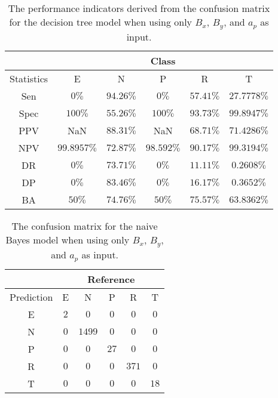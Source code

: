 \begin{table}[!ht]
	\centering
	\begin{tabular}{|c|c|c|c|c|c|}
		\hline
		 & \multicolumn{5}{c|}{Class} \\ \hline
		Statistics & E & N & P & R & T \\ \hline
		Sen & $0\%$ & $94.26\%$ & $0\%$ & $57.41\%$ & $27.7778\%$ \\ \hline
		Spec & $100\%$ & $55.26\%$ & $100\%$ & $93.73\%$ & $99.8947\%$ \\ \hline
		PPV & NaN & $88.31\%$ & NaN & $68.71\%$ & $71.4286\%$ \\ \hline
		NPV & $99.8957\%$ & $72.87\%$ & $98.592\%$ & $90.17\%$ & $99.3194\%$ \\ \hline
		DR & $0\%$ & $73.71\%$ & $0\%$ & $11.11\%$ & $0.2608\%$ \\ \hline
		DP & $0\%$ & $83.46\%$ & $0\%$ & $16.17\%$ & $0.3652\%$ \\ \hline
		BA & $50\%$ & $74.76\%$ & $50\%$ & $75.57\%$ & $63.8362\%$ \\ \hline
	\end{tabular}
	\caption{The performance indicators derived from the confusion matrix for the decision tree model when using only $B_{x}$, $B_{y}$, and $a_{p}$ as input.}
	\label{tab:cs:reverse:xyap:C5.0}
\end{table}

\begin{table}[!ht]
	\centering
	\begin{tabular}{|c|c|c|c|c|c|}
		\hline
		 & \multicolumn{5}{|c|}{Reference} \\ \hline
		 Prediction & E & N & P & R & T \\ \hline
		 E & $2$ & $0$ & $0$ & $0$ & $0$ \\ \hline
		 N & $0$ & $1499$ & $0$ & $0$ & $0$ \\ \hline
		 P & $0$ & $0$ & $27$ & $0$ & $0$ \\ \hline
		 R & $0$ & $0$ & $0$ & $371$ & $0$ \\ \hline
		 T & $0$ & $0$ & $0$ & $0$ & $18$ \\ \hline
	\end{tabular}
	\caption{The confusion matrix for the naive Bayes model when using only $B_{x}$, $B_{y}$, and $a_{p}$ as input.}
	\label{tab:cm:xyap:nb}
\end{table}

